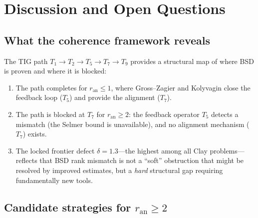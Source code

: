 \documentclass[11pt]{article}
\begin{document}
\section{Discussion and Open Questions}
\label{sec:discussion}

\subsection{What the coherence framework reveals}

The TIG path $T_1 \to T_2 \to T_5 \to T_7 \to T_9$ provides a structural map
of where BSD is proven and where it is blocked:

\begin{enumerate}
  \item The path completes for $r_{\mathrm{an}} \leq 1$, where Gross--Zagier and
    Kolyvagin close the feedback loop ($T_5$) and provide the alignment ($T_7$).
  \item The path is blocked at $T_7$ for $r_{\mathrm{an}} \geq 2$: the feedback
    operator $T_5$ detects a mismatch (the Selmer bound is unavailable), and no
    alignment mechanism ($T_7$) exists.
  \item The locked frontier defect $\delta = 1.3$---the highest among all Clay
    problems---reflects that BSD rank mismatch is not a ``soft'' obstruction that
    might be resolved by improved estimates, but a \emph{hard} structural gap
    requiring fundamentally new tools.
\end{enumerate}

\subsection{Candidate strategies for $r_{\mathrm{an}} \geq 2$}
\end{document}
